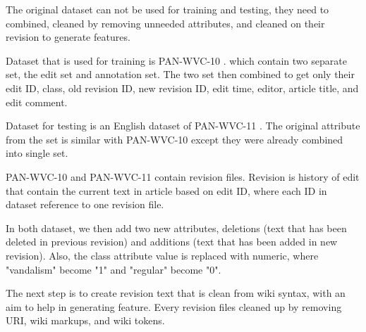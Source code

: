 The original dataset can not be used for training and testing, they need to
combined, cleaned by removing unneeded attributes, and cleaned on their revision
to generate features.

Dataset that is used for training is PAN-WVC-10 \cite{potthast2008automatic}.
which contain two separate set, the edit set and annotation set.
The two set then combined to get only their edit ID, class, old revision ID,
new revision ID, edit time, editor, article title, and edit comment.

Dataset for testing is an English dataset of PAN-WVC-11 \cite{potthast:2010b}.
The original attribute from the set is similar with PAN-WVC-10 except they were
already combined into single set.

PAN-WVC-10 and PAN-WVC-11 contain revision files.
Revision is history of edit that contain the current text in article based on
edit ID, where each ID in dataset reference to one revision file.

In both dataset, we then add two new attributes, deletions
(text that has been deleted in previous revision) and additions (text that
has been added in new revision).
Also, the class attribute value is replaced with numeric, where
"vandalism" become "1" and "regular" become "0".

The next step is to create revision text that is clean from wiki syntax, with
an aim to help in generating feature.
Every revision files cleaned up by removing URI, wiki markups, and wiki tokens.
